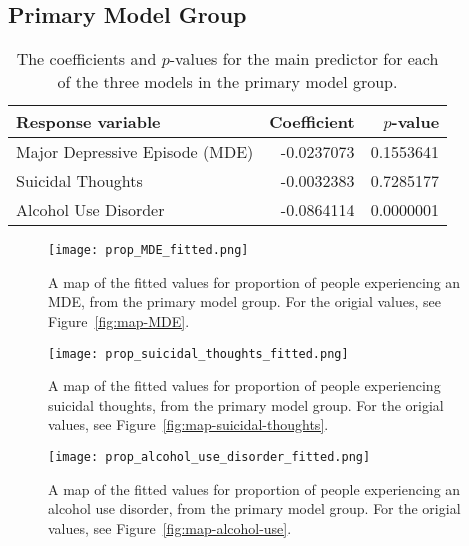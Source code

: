 \documentclass{article}
\begin{document}
\subsection{Primary Model Group}

\begin{table}[!htb]
\begin{center}
\begin{tabular}{l r r}
    \hline
    Response variable & Coefficient & $p$-value\\
    \hline
    Major Depressive Episode (MDE) & -0.0237073 & 0.1553641\\
    Suicidal Thoughts & -0.0032383 & 0.7285177\\
    Alcohol Use Disorder & -0.0864114 & 0.0000001\\
    \hline
\end{tabular}
\caption{\label{tab:primary-model-results} The coefficients and $p$-values
    for the main predictor for each of the three models
    in the primary model group.
}
\end{center}
\end{table}

\begin{figure}[!htb]
    \centering
    \texttt{[image: prop\_MDE\_fitted.png]}
    \caption{A map of the fitted values for proportion of people experiencing an
    MDE, from the primary model group. For the origial values, see
    Figure~\ref{fig:map-MDE}.}
    \label{fig:map-fitted-MDE}
\end{figure}

\begin{figure}[!htb]
    \centering
    \texttt{[image: prop\_suicidal\_thoughts\_fitted.png]}
    \caption{A map of the fitted values for proportion of people experiencing
    suicidal thoughts, from the primary model group. For the origial values, see
    Figure~\ref{fig:map-suicidal-thoughts}.}
    \label{fig:map-fitted-suicidal-thoughts}
\end{figure}

\begin{figure}[!htb]
    \centering
    \texttt{[image: prop\_alcohol\_use\_disorder\_fitted.png]}
    \caption{A map of the fitted values for proportion of people experiencing an
    alcohol use disorder, from the primary model group.
    For the origial values, see Figure~\ref{fig:map-alcohol-use}.}
    \label{fig:map-fitted-alcohol-use}
\end{figure}
\end{document}
